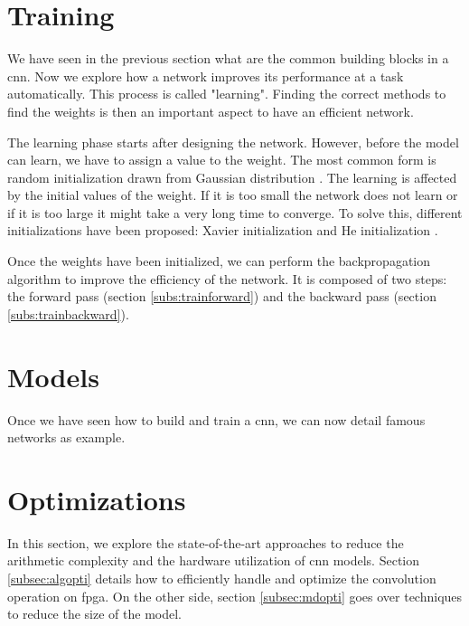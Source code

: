 \section{Training} \label{sec:train}
We have seen in the previous section what are the common building blocks in a \acrshort{cnn}. Now we explore how a network improves its performance at a task automatically. This process is called "learning". Finding the correct methods to find the weights is then an important aspect to have an efficient network.

The learning phase starts after designing the network. However, before the model can learn, we have to assign a value to the weight. The most common form is random initialization drawn from Gaussian distribution \cite{he_delving_2015}. The learning is affected by the initial values of the weight. If it is too small the network does not learn or if it is too large it might take a very long time to converge. To solve this, different initializations have been proposed: Xavier initialization \cite{glorot_understanding_2010} and He initialization \cite{he_delving_2015}.

Once the weights have been initialized, we can perform the backpropagation algorithm to improve the efficiency of the network. It is composed of two steps: the forward pass (section \ref{subs:trainforward}) and the backward pass (section \ref{subs:trainbackward}).
%
%

%

%
%
\section{Models}
Once we have seen how to build and train a \acrshort{cnn}, we can now detail famous networks as example.
%

%
%
\section{Optimizations}
%
%
In this section, we explore the state-of-the-art approaches to reduce the arithmetic complexity and the hardware utilization of \acrshort{cnn} models. Section \ref{subsec:algopti} details how to efficiently handle and optimize the convolution operation on \acrshort{fpga}. On the other side, section \ref{subsec:mdopti} goes over techniques to reduce the size of the model.
%

%

